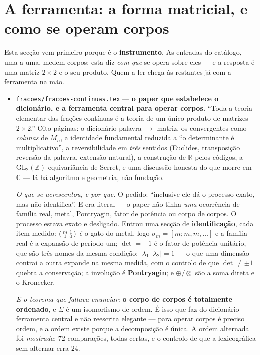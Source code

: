 \documentclass[11pt]{article}
\providecommand{\GL}{\mathrm{GL}}
\newcommand{\code}[1]{\texttt{\small #1}}
\newcommand{\Z}{\mathbb Z}
\newcommand{\R}{\mathbb R}
\newcommand{\C}{\mathbb C}
\theoremstyle{plain}
\theoremstyle{remark}
\providecommand{\Mat}[1]{\begin{psmallmatrix}#1&1\\1&0\end{psmallmatrix}}
\begin{document}
\section{A ferramenta: a forma matricial, e como se operam corpos}

Esta secção vem primeiro porque é o \textbf{instrumento}. As entradas do catálogo, uma a uma, medem
corpos; esta diz \emph{com que} se opera sobre eles --- e a resposta é uma matriz $2\times2$ e o seu
produto. Quem a ler chega às restantes já com a ferramenta na mão.

\begin{itemize}
\item \code{fracoes/fracoes-continuas.tex} --- \textbf{o paper que estabelece o dicionário, e a
ferramenta central para operar corpos.} ``Toda a teoria elementar das frações contínuas é a teoria
de um único produto de matrizes $2\times2$.'' Oito páginas: o dicionário palavra $\to$ matriz, os
convergentes como \emph{colunas} de $M_n$, a identidade fundamental reduzida a ``o determinante é
multiplicativo'', a reversibilidade em \emph{três} sentidos (Euclides, transposição $=$ reversão da
palavra, extensão natural), a construção de $\R$ pelos códigos, a $\GL_2(\Z)$-equivariância de
Serret, e uma discussão honesta do que morre em $\C$ --- lá há algoritmo e geometria, não fundação.

\emph{O que se acrescentou, e por que.} O pedido: ``inclusive ele dá o processo exato, mas não
identifica''. E era literal --- o paper não tinha \emph{uma} ocorrência de família real, metal,
Pontryagin, fator de potência ou corpo de corpos. O processo estava exato e desligado. Entrou uma
secção de \textbf{identificação}, cada item medido: $\Mat{m}$ \emph{é} o gato do metal, logo
$\sigma_m = [m;m,m,\ldots]$ e a família real é a expansão de período um; $\det = -1$ é o fator de
potência unitário, que são três nomes da mesma condição; $|\lambda_1||\lambda_2| = 1$ --- o que uma
dimensão contrai a outra expande na mesma medida, com o controlo de que $\det \neq \pm1$ quebra a
conservação; a involução é \textbf{Pontryagin}; e $\oplus/\otimes$ são a soma direta e o Kronecker.

\emph{E o teorema que faltava enunciar:} \textbf{o corpo de corpos é totalmente ordenado}, e
$\Sigma$ é um isomorfismo de ordem. É isso que faz do dicionário ferramenta central e não reescrita
elegante --- para operar corpos é preciso ordem, e a ordem existe porque a decomposição é única. A
ordem alternada foi \emph{mostrada}: $72$ comparações, todas certas, e o controlo de que a
lexicográfica sem alternar erra $24$.


\end{itemize}
\end{document}
